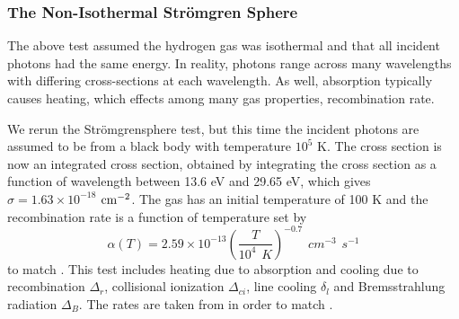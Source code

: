 \documentclass[fleq,usenatbib]{mnras}
\newcommand{\strom}{Str\"omgren}
\begin{document}
\subsubsection{The Non-Isothermal \strom{} Sphere}
The above test assumed the hydrogen gas was isothermal and that all incident 
photons had the same energy. In reality, photons range across many wavelengths 
with differing cross-sections at each wavelength. As well, absorption 
typically causes heating, which effects among many gas properties, 
recombination rate.

We rerun the \strom sphere test, but this time the incident photons are 
assumed to be from a black body with temperature $10^5$ K. The cross section 
is now an integrated cross section, obtained by integrating the cross section 
as a function of wavelength between 13.6 eV and 29.65 eV, which gives $\sigma 
= 1.63 \times 10^{-18}$ $\rm cm^{-2}$. The gas has an initial temperature of 
100 K and the recombination rate is a function of temperature set by
\begin{equation}
\alpha(T) = 2.59 \times 10^{-13} \left( \frac{T}{10^4 \hspace{5pt} K}\right)^
{-0.7} \hspace{5pt} cm^{-3} \hspace{5pt} s^{-1}
\end{equation}
to match \cite{petkovaSpringel09}. This test includes heating due to 
absorption and cooling due to recombination $\Delta_r$, collisional 
ionization $\Delta_{ci}$, line cooling $\delta_l$ and Bremsstrahlung 
radiation $\Delta_B$. The rates are taken from \cite{cen92} in order to
match \cite{petkovaSpringel09}.
\end{document}
